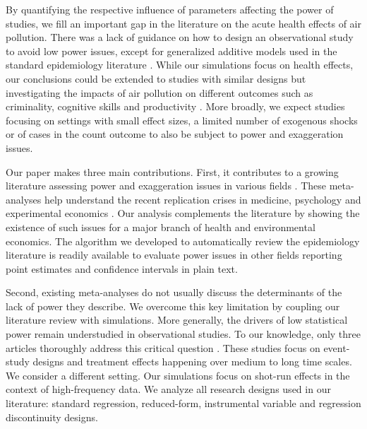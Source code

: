 \documentclass[12pt]{article}
\begin{document}
    By quantifying the respective influence of parameters affecting the power of studies, we fill an important gap in the literature on the acute health effects of air pollution. There was a lack of guidance on how to design an observational study to avoid low power issues, except for generalized additive models used in the standard epidemiology literature \citep{winquist2012power}. While our simulations focus on health effects, our conclusions could be extended to studies with similar designs but investigating the impacts of air pollution on different outcomes such as criminality, cognitive skills and productivity \citep{herrnstadt_air_2021, ebenstein_long-run_2016, adhvaryu2022management}. More broadly, we expect studies focusing on settings with small effect sizes, a limited number of exogenous shocks or of cases in the count outcome to also be subject to power and exaggeration issues. 
    
    Our paper makes three main contributions. First, it contributes to a growing literature assessing power and exaggeration issues in various fields \citep{ioannidis_why_2008, gelman_beyond_2014, ioannidis_power_2017, ferraro_featureis_2020, stommes2021reliability, arel_bundock_quantitative_2022}. These meta-analyses help understand the recent replication crises in medicine, psychology and experimental economics \citep{button_power_2013, open_science_collaboration_estimating_2015, camerer_evaluating_2018}. Our analysis complements the literature by showing the existence of such issues for a major branch of health and environmental economics. The algorithm we developed to automatically review the epidemiology literature is readily available to evaluate power issues in other fields reporting point estimates and confidence intervals in plain text.
    
    Second, existing meta-analyses do not usually discuss the determinants of the lack of power they describe. We overcome this key limitation by coupling our literature review with simulations. More generally, the drivers of low statistical power remain understudied in observational studies. To our knowledge, only three articles thoroughly address this critical question \citep{schell_evaluating_2018, griffin_moving_2021, black_simulated_2022}. These studies focus on event-study designs and treatment effects happening over medium to long time scales. We consider a different setting. Our simulations focus on shot-run effects in the context of high-frequency data. We analyze all research designs used in our literature: standard regression, reduced-form, instrumental variable and regression discontinuity designs.
    
\end{document}
